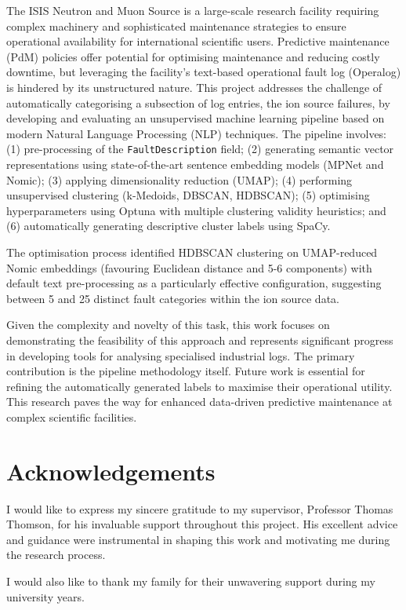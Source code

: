 \documentclass[10pt,oneside]{report}
\begin{document}
The ISIS Neutron and Muon Source is a large-scale research facility requiring complex machinery and sophisticated maintenance strategies to ensure operational availability for international scientific users. Predictive maintenance (PdM) policies offer potential for optimising maintenance and reducing costly downtime, but leveraging the facility's text-based operational fault log (Operalog) is hindered by its unstructured nature. This project addresses the challenge of automatically categorising a subsection of log entries, the ion source failures, by developing and evaluating an unsupervised machine learning pipeline based on modern Natural Language Processing (NLP) techniques. The pipeline involves: (1) pre-processing of the \texttt{FaultDescription} field; (2) generating semantic vector representations using state-of-the-art sentence embedding models (MPNet and Nomic); (3) applying dimensionality reduction (UMAP); (4) performing unsupervised clustering (k-Medoids, DBSCAN, HDBSCAN); (5) optimising hyperparameters using Optuna with multiple clustering validity heuristics; and (6) automatically generating descriptive cluster labels using SpaCy. 

The optimisation process identified HDBSCAN clustering on UMAP-reduced Nomic embeddings (favouring Euclidean distance and 5-6 components) with default text pre-processing as a particularly effective configuration, suggesting between 5 and 25 distinct fault categories within the ion source data.

Given the complexity and novelty of this task, this work focuses on demonstrating the feasibility of this approach and represents significant progress in developing tools for analysing specialised industrial logs. The primary contribution is the pipeline methodology itself. Future work is essential for refining the automatically generated labels to maximise their operational utility. This research paves the way for enhanced data-driven predictive maintenance at complex scientific facilities.

\chapter*{Acknowledgements}
I would like to express my sincere gratitude to my supervisor, Professor Thomas Thomson, for his invaluable support throughout this project. His excellent advice and guidance were instrumental in shaping this work and motivating me during the research process.

I would also like to thank my family for their unwavering support during my university years.
\end{document}

